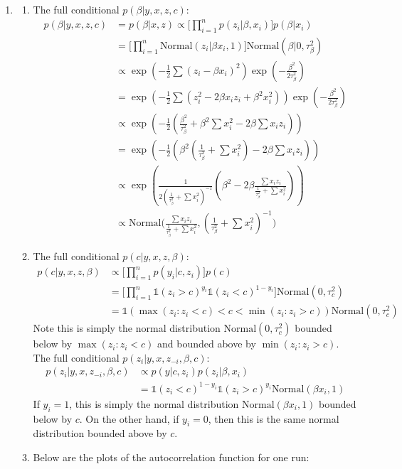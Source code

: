\documentclass{article}
\begin{document}
\begin{enumerate}
\begin{enumerate}
\end{enumerate}

\item

\begin{enumerate}
\item The full conditional $p(\beta | y,x,z,c)$:
\begin{align*}
p(\beta | y,x,z,c) &= p(\beta | x,z) \propto \Big[\prod\limits_{i=1}^{n} p(z_i | \beta,x_i)\Big]p(\beta|x_i) \\
&=\Big[\prod\limits_{i=1}^{n} \text{Normal}(z_i|\beta x_i,1) \Big]\text{Normal}(\beta|0,\tau_\beta^2) \\
&\propto \exp(-\frac{1}{2} \sum(z_i-\beta x_i)^2)\exp(-\frac{\beta^2}{2\tau_\beta^2}) \\
&= \exp(-\frac{1}{2} \sum(z_i^2-2\beta x_i z_i+\beta^2 x_i^2))\exp(-\frac{\beta^2}{2\tau_\beta^2}) \\
&\propto \exp(-\frac{1}{2}(\frac{\beta^2}{\tau_\beta^2}+\beta^2\sum x_i^2-2\beta\sum x_i z_i)) \\
&= \exp(-\frac{1}{2}(\beta^2(\frac{1}{\tau_\beta^2}+\sum x_i^2)-2\beta\sum x_i z_i)) \\
&\propto \exp(\frac{1}{2(\frac{1}{\tau_\beta^2}+\sum x_i^2)^{-1}}(\beta^2-2\beta \frac{\sum x_i z_i}{\frac{1}{\tau_\beta^2}+\sum x_i^2})) \\
&\propto \text{Normal}\Big(\frac{\sum x_i z_i}{\frac{1}{\tau_\beta^2}+\sum x_i^2}, (\frac{1}{\tau_\beta^2}+\sum x_i^2)^{-1}\Big)
\end{align*}

\item The full conditional $p(c|y,x,z,\beta)$:
\begin{align*}
p(c|y,x,z,\beta) &\propto \Big[\prod\limits_{i=1}^{n}p(y_i|c,z_i)\Big]p(c) \\
&= \Big[\prod\limits_{i=1}^{n}\mathds{1}(z_i>c)^{y_i}\mathds{1}(z_i<c)^{1-y_i}\Big]\text{Normal}(0,\tau_c^2) \\
&= \mathds{1}(\max(z_i:z_i<c)<c<\min(z_i:z_i>c))\text{Normal}(0,\tau_c^2)
\end{align*}
Note this is simply the normal distribution $\text{Normal}(0,\tau_c^2)$ bounded below by $\max(z_i:z_i<c)$ and bounded above by $\min(z_i:z_i>c)$.\\

The full conditional $p(z_i|y,x,z_{-i},\beta,c)$:
\begin{align*}
p(z_i|y,x,z_{-i},\beta,c) &\propto p(y|c,z_i)p(z_i|\beta,x_i) \\
&= \mathds{1}(z_i<c)^{1-y_i}\mathds{1}(z_i>c)^{y_i}\text{Normal}(\beta x_i,1)
\end{align*}
If $y_i=1$, this is simply the normal distribution $\text{Normal}(\beta x_i,1)$ bounded below by $c$. On the other hand, if $y_i=0$, then this is the same normal distribution bounded above by $c$.
\pagebreak
\item Below are the plots of the autocorrelation function for one run:


\end{enumerate}
\end{enumerate}
\end{document}
